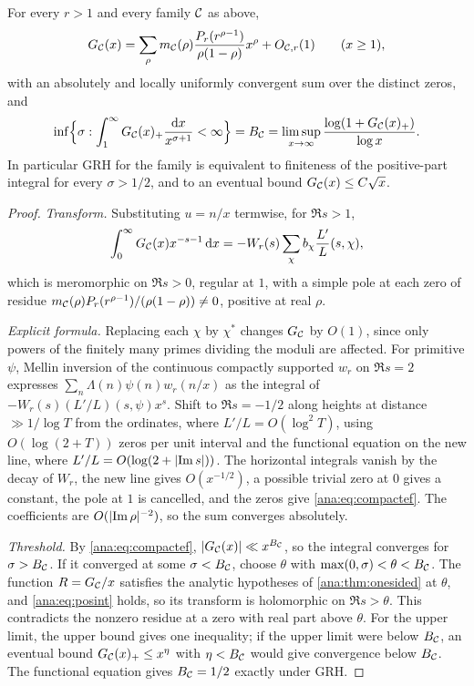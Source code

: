 \begin{theorem}\label{ana:thm:compact}
For every $r>1$ and every family $\mathcal{C}$ as above,
\begin{equation}\label{ana:eq:compactef}
 G_{\mathcal{C}}(x)=\sum_\rho m_{\mathcal{C}}(\rho)\frac{P_r(r^{\rho-1})}{\rho(1-\rho)}x^\rho+O_{\mathcal{C},r}(1)
 \qquad(x\ge1),
\end{equation}
with an absolutely and locally uniformly convergent sum over the distinct zeros, and
\[
 \inf\Bigl\{\sigma:\int_1^\infty G_{\mathcal{C}}(x)_+\frac{\mathrm{d} x}{x^{\sigma+1}}<\infty\Bigr\}=B_{\mathcal{C}}
 =\limsup_{x\to\infty}\frac{\log(1+G_{\mathcal{C}}(x)_+)}{\log x}.
\]
In particular GRH for the family is equivalent to finiteness of the positive-part integral
for every $\sigma>1/2$, and to an eventual bound $G_{\mathcal{C}}(x)\le C\sqrt x$.
\end{theorem}

\begin{proof}
\emph{Transform.} Substituting $u=n/x$ termwise, for $\Re s>1$,
\[
 \int_0^\infty G_{\mathcal{C}}(x)x^{-s-1}\,\mathrm{d} x=-W_r(s)\sum_\chi b_\chi\frac{L'}L(s,\chi),
\]
which is meromorphic on $\Re s>0$, regular at $1$, with a simple pole at each zero of residue
$m_{\mathcal{C}}(\rho)P_r(r^{\rho-1})/(\rho(1-\rho))\ne0$, positive at real $\rho$.

\emph{Explicit formula.} Replacing each $\chi$ by $\chi^*$ changes $G_{\mathcal{C}}$ by $O(1)$, since only
powers of the finitely many primes dividing the moduli are affected. For primitive $\psi$,
Mellin inversion of the continuous compactly supported $w_r$ on $\Re s=2$ expresses
$\sum_n\Lambda(n)\psi(n)w_r(n/x)$ as the integral of $-W_r(s)(L'/L)(s,\psi)x^s$. Shift to
$\Re s=-1/2$ along heights at distance $\gg1/\log T$ from the ordinates, where
$L'/L=O(\log^2T)$, using $O(\log(2+T))$ zeros per unit interval
\cite[Lemma~11.4]{Koukoulopoulos2019Distribution} and the functional equation on the new line,
where $L'/L=O(\log(2+\lvert\operatorname{Im} s\rvert))$. The horizontal integrals vanish by the decay of $W_r$,
the new line gives $O(x^{-1/2})$, a possible trivial zero at $0$ gives a constant, the pole at
$1$ is cancelled, and the zeros give \eqref{ana:eq:compactef}. The coefficients are
$O(\lvert\operatorname{Im}\rho\rvert^{-2})$, so the sum converges absolutely.

\emph{Threshold.} By \eqref{ana:eq:compactef}, $\lvert G_{\mathcal{C}}(x)\rvert\ll x^{B_{\mathcal{C}}}$, so the
integral converges for $\sigma>B_{\mathcal{C}}$. If it converged at some $\sigma<B_{\mathcal{C}}$, choose
$\theta$ with $\max(0,\sigma)<\theta<B_{\mathcal{C}}$. The function $R=G_{\mathcal{C}}/x$ satisfies the
analytic hypotheses of \cref{ana:thm:onesided} at $\theta$, and \eqref{ana:eq:posint} holds,
so its transform is holomorphic on $\Re s>\theta$. This contradicts the nonzero residue at a
zero with real part above $\theta$. For the upper limit, the upper bound gives one
inequality; if the upper limit were below $B_{\mathcal{C}}$, an eventual bound $G_{\mathcal{C}}(x)_+\le x^\eta$
with $\eta<B_{\mathcal{C}}$ would give convergence below $B_{\mathcal{C}}$. The functional equation gives
$B_{\mathcal{C}}=1/2$ exactly under GRH.
\end{proof}

